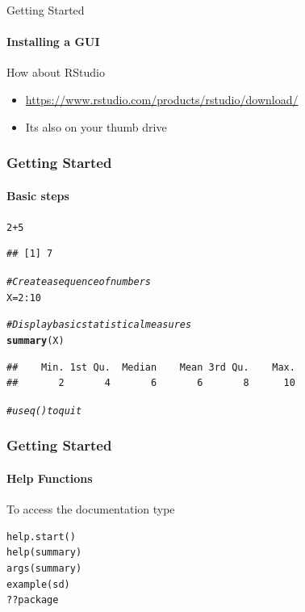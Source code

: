 \documentclass[10pt,handout,english]{beamer}\usepackage[]{graphicx}\usepackage[]{color}
\makeatletter
\newcommand{\hlnum}[1]{\textcolor[rgb]{0.686,0.059,0.569}{#1}}%
\newcommand{\hlcom}[1]{\textcolor[rgb]{0.678,0.584,0.686}{\textit{#1}}}%
\newcommand{\hlopt}[1]{\textcolor[rgb]{0,0,0}{#1}}%
\newcommand{\hlstd}[1]{\textcolor[rgb]{0.345,0.345,0.345}{#1}}%
\newcommand{\hlkwb}[1]{\textcolor[rgb]{0.69,0.353,0.396}{#1}}%
\newcommand{\hlkwd}[1]{\textcolor[rgb]{0.737,0.353,0.396}{\textbf{#1}}}%
\newenvironment{kframe}{%
 \def\at@end@of@kframe{}%
 \ifinner\ifhmode%
  \def\at@end@of@kframe{\end{minipage}}%
  \begin{minipage}{\columnwidth}%
 \fi\fi%
 \def\FrameCommand##1{\hskip\@totalleftmargin \hskip-\fboxsep
 \colorbox{shadecolor}{##1}\hskip-\fboxsep
     \hskip-\linewidth \hskip-\@totalleftmargin \hskip\columnwidth}%
 \MakeFramed {\advance\hsize-\width
   \@totalleftmargin\z@ \linewidth\hsize
   \@setminipage}}%
 {\par\unskip\endMakeFramed%
 \at@end@of@kframe}
\newenvironment{knitrout}{}{} %
\makeatother
\begin{document}
\begin{frame}{Getting Started}
\framesubtitle{Installing a GUI}
\begin{block}{How about RStudio}
\begin{itemize}
\item \url{https://www.rstudio.com/products/rstudio/download/}
\item Its also on your thumb drive
\end{itemize}
\end{block}

\end{frame}

\begin{frame}[fragile]
  \frametitle{Getting Started}
  \framesubtitle{Basic steps}

\begin{knitrout}
\color{fgcolor}\begin{kframe}
\begin{alltt}
\hlnum{2}\hlopt{+}\hlnum{5}
\end{alltt}
\begin{verbatim}
## [1] 7
\end{verbatim}
\begin{alltt}
\hlcom{# Create a sequence of numbers}
\hlstd{X} \hlkwb{=} \hlnum{2}\hlopt{:}\hlnum{10}

\hlcom{# Display basic statistical measures}
\hlkwd{summary}\hlstd{(X)}
\end{alltt}
\begin{verbatim}
##    Min. 1st Qu.  Median    Mean 3rd Qu.    Max. 
##       2       4       6       6       8      10
\end{verbatim}
\begin{alltt}
\hlcom{# use q() to quit}
\end{alltt}
\end{kframe}
\end{knitrout}
\clearpage
\end{frame}

\begin{frame}[fragile]
  \frametitle{Getting Started}
  \framesubtitle{Help Functions}
\begin{block}{To access the documentation type}
\end{block}
\begin{lstlisting} 
help.start()
help(summary)
args(summary)
example(sd)
??package
\end{lstlisting} 
\clearpage
\end{frame}
\end{document}
